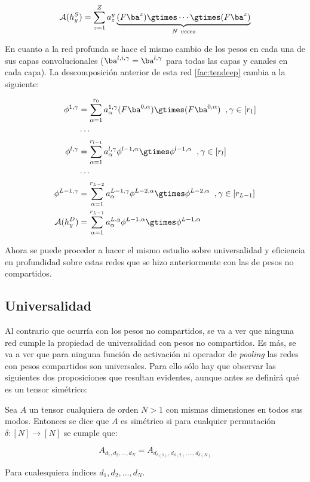 \begin{equation} \label{fac:shalcomp}
\mathcal{A}(h_y^S)=\sum_{z=1}^{Z}a^y_z \underbrace{(F\ba^{z})\gtimes\cdots \gtimes(F\ba^{z})}_{N\textit{ veces}}
\end{equation}

En cuanto a la red profunda se hace el mismo cambio de los pesos en cada una de sus capas convolucionales ($\ba^{l,i,\gamma} = \ba^{l,\gamma}$ para todas las capas y canales en cada capa). La descomposición anterior de esta red \eqref{fac:tendeep} cambia a la siguiente:

\begin{equation}\label{fac:deepcomp}
\begin{aligned}
\phi^{1,\gamma} &= \sum^{r_0}_{\alpha=1}a_\alpha^{1,\gamma}(F\ba^{0,\alpha})\gtimes(F\ba^{0,\alpha}) \;\; ,\gamma \in [r_1] \\
&\cdots  \\
\phi^{l,\gamma} &= \sum^{r_{l-1}}_{\alpha=1}a_\alpha^{l,\gamma}\phi^{l-1,\alpha}\gtimes\phi^{l-1,\alpha} \;\; ,\gamma \in [r_l]\\
&\cdots  \\
\phi^{L-1,\gamma} &= \sum^{r_{L-2}}_{\alpha=1}a_\alpha^{L-1,\gamma}\phi^{L-2,\alpha}\gtimes\phi^{L-2,\alpha} \;\; ,\gamma \in [r_{L-1}]\\
\mathcal{A}(h_y^D) &= \sum^{r_{L-1}}_{\alpha=1}a_\alpha^{L,y}\phi^{L-1,\alpha}\gtimes\phi^{L-1,\alpha}\\
\end{aligned}
\end{equation}

Ahora se puede proceder a hacer el mismo estudio sobre universalidad y eficiencia en profundidad sobre estas redes que se hizo anteriormente con las de pesos no compartidos. 

\subsection{Universalidad}

Al contrario que ocurría con los pesos no compartidos, se va a ver que ninguna red cumple la propiedad de universalidad con pesos no compartidos. Es más, se va a ver que para ninguna función de activación ni operador de \textit{pooling} las redes con pesos compartidos son universales. Para ello sólo hay que observar las siguientes dos proposiciones que resultan evidentes, aunque antes se definirá qué es un tensor simétrico:

\begin{definicion}
Sea $A$ un tensor cualquiera de orden $N>1$ con mismas dimensiones en todos sus modos. Entonces se dice que $A$ es simétrico si  para cualquier permutación $\delta:[N]\rightarrow [N]$ se cumple que:

$$
A_{d_1,d_2,... ,d_N} = A_{d_{\delta(1)},d_{\delta(2)},... ,d_{\delta(N)}}
$$

Para cualesquiera índices $d_1,d_2,... ,d_N$.  
\end{definicion}

